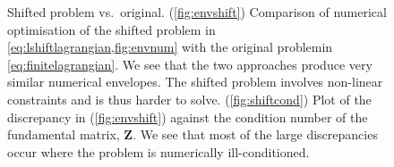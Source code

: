 \documentclass[12pt]{article}
\newcommand{\fund}{\mathbf{Z}}
\begin{document}
\begin{figure}[ht]
\begin{center}
\begin{myenuma}
  \item {}
  \label{fig:envshift}
  \item {}
  \label{fig:shiftcond}
\end{myenuma}
\caption[Shifted problem vs.\ original]{Shifted problem vs.\ original.
(\ref*{fig:envshift}) Comparison of numerical optimisation of the shifted problem in \cref{eq:lshiftlagrangian,fig:envnum} with the original problemin \cref{eq:finitelagrangian}.
We see that the two approaches produce very similar numerical envelopes.
The shifted problem involves non-linear constraints and is thus harder to solve.
(\ref{fig:shiftcond}) Plot of the discrepancy in (\ref*{fig:envshift}) against the condition number of the fundamental matrix, \(\fund \).
We see that most of the large discrepancies occur where the problem is numerically ill-conditioned.
\label{fig:shifted}}
\end{center}
\end{figure}
\end{document}
